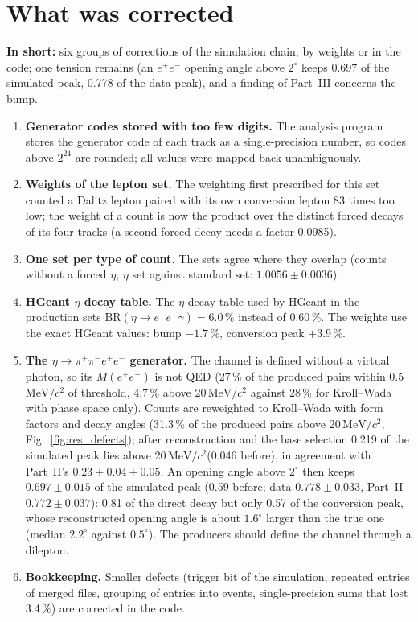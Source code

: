 \documentclass[11pt,a4paper]{article}
\newcommand{\ee}{\ensuremath{e^{+}e^{-}}\xspace}
\newcommand{\ppee}{\ensuremath{\pi^{+}\pi^{-}e^{+}e^{-}}\xspace}
\newcommand{\Mee}{\ensuremath{M(e^{+}e^{-})}\xspace}
\newcommand{\MeVcc}{\ensuremath{\mathrm{MeV}/c^{2}}\xspace}
\newcommand{\inshort}[1]{\par\noindent\colorbox{black!5}{\parbox{\dimexpr\linewidth-2\fboxsep\relax}{\textbf{In short:} #1}}\par}
\begin{document}
\section{What was corrected}
\label{sec:corr}
\inshort{six groups of corrections of the simulation chain, by weights or in the code; one tension remains
(an \ee opening angle above $2^\circ$ keeps 0.697 of the simulated peak, 0.778 of the data peak), and a finding of
Part~III concerns the bump.}
\begin{enumerate}
\item \textbf{Generator codes stored with too few digits.} The analysis program stores the generator code of each track
      as a single-precision number, so codes above $2^{24}$ are rounded; all values were mapped back unambiguously.
\item \textbf{Weights of the lepton set.} The weighting first prescribed for this set counted a Dalitz lepton paired with
      its own conversion lepton 83 times too low; the weight of a count is now the product over the distinct forced decays of
      its four tracks (a second forced decay needs a factor 0.0985).
\item \textbf{One set per type of count.} The sets agree where they overlap (counts without a forced $\eta$, $\eta$ set
      against standard set: $1.0056\pm0.0036$).
\item \textbf{HGeant $\eta$ decay table.} The $\eta$ decay table used by HGeant in the production sets
      $\mathrm{BR}(\eta\to\ee\gamma) = 6.0\,\%$ instead of 0.60\,\%. The weights use the exact HGeant values: bump $-1.7\,\%$,
      conversion peak $+3.9\,\%$.
\item \textbf{The $\eta\to\ppee$ generator.} The channel is defined without a virtual photon, so its \Mee is not QED
      (27\,\% of the produced pairs within 0.5\,\MeVcc of threshold, 4.7\,\% above 20\,\MeVcc against 28\,\% for Kroll--Wada with
      phase space only). Counts are reweighted to Kroll--Wada with form factors and decay angles (31.3\,\% of the produced pairs
      above 20\,\MeVcc, Fig.~\ref{fig:res_defects}); after reconstruction and the base selection 0.219 of the simulated peak
      lies above 20\,\MeVcc (0.046 before), in agreement with Part~II's $0.23\pm0.04\pm0.05$. An opening angle above $2^\circ$
      then keeps $0.697\pm0.015$ of the simulated peak (0.59 before; data $0.778\pm0.033$, Part~II $0.772\pm0.037$): 0.81 of the
      direct decay but only 0.57 of the conversion peak, whose reconstructed opening angle is about $1.6^\circ$ larger than the
      true one (median $2.2^\circ$ against $0.5^\circ$). The producers should define the channel through a dilepton.
\item \textbf{Bookkeeping.} Smaller defects (trigger bit of the simulation, repeated entries of merged files, grouping of
      entries into events, single-precision sums that lost 3.4\,\%) are corrected in the code.
\end{enumerate}
\end{document}
